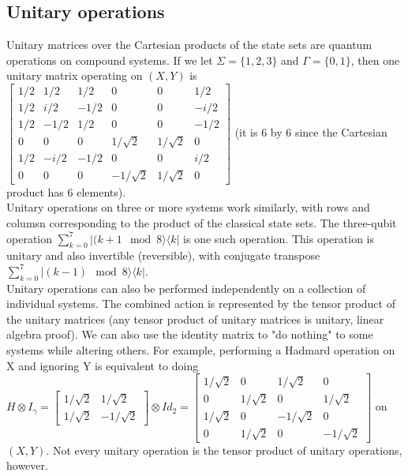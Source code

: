 \documentclass{amsart}
\begin{document}
\subsection*{Unitary operations}
Unitary matrices over the Cartesian products of the state sets are quantum operations on
compound systems. If we let $ \Sigma = \{1,2,3\} $ and $ \Gamma = \{0,1\} $, then one unitary
matrix operating on $ (X,Y) $ is $ \begin{bmatrix}
1/2 & 1/2 & 1/2 & 0 & 0 & 1/2 \\
1/2 & i/2 & -1/2 & 0 & 0 & -i/2 \\
1/2 & -1/2 & 1/2 & 0 & 0 & -1/2 \\
0 & 0 & 0 & 1/\sqrt{2} & 1/\sqrt{2} & 0 \\
1/2 & -i/2 & -1/2 & 0 & 0 & i/2 \\
0 & 0 & 0 & -1/\sqrt{2} & 1/\sqrt{2} & 0
\end{bmatrix} $ (it is 6 by 6 since the Cartesian product has 6 elements). \\
Unitary operations on three or more systems work similarly, with rows and columsn
corresponding to the product of the classical state sets. The three-qubit operation
$ \sum_{k=0}^7 |(k + 1 \mod 8\rangle \langle k| $ is one such operation. This operation is
unitary and also invertible (reversible), with conjugate transpose
$ \sum_{k=0}^7 |(k-1) \mod 8\rangle \langle k| $. \\
Unitary operations can also be performed independently on a collection of individual systems.
The combined action is represented by the tensor product of the unitary matrices (any tensor
product of unitary matrices is unitary, linear algebra proof). We can also use the identity
matrix to "do nothing" to some systems while altering others. For example, performing a
Hadmard operation on X and ignoring Y is equivalent to doing $ H \otimes I_{\gamma} =
\begin{bmatrix}
1/\sqrt{2} & 1/\sqrt{2} \\ 1/\sqrt{2} & -1/\sqrt{2}
\end{bmatrix} \otimes Id_2 = \begin{bmatrix}
1/\sqrt{2} & 0 & 1/\sqrt{2} & 0 \\ 0 & 1/\sqrt{2} & 0 & 1/\sqrt{2} \\ 1/\sqrt{2} & 0 &
-1/\sqrt{2} & 0 \\ 0 & 1/\sqrt{2} & 0 & -1/\sqrt{2}
\end{bmatrix} $ on $ (X,Y) $. Not every unitary operation is the tensor product of unitary
operations, however. \\
\end{document}
